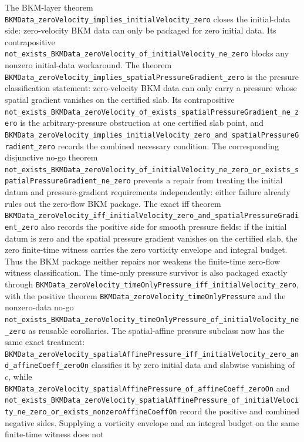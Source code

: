 \documentclass[11pt]{article}
\begin{document}
The BKM-layer theorem
\texttt{BKMData\_zeroVelocity\_implies\_initialVelocity\_zero}
closes the initial-data side: zero-velocity BKM data can only be packaged for
zero initial data.  Its contrapositive
\texttt{not\_exists\_BKMData\_zeroVelocity\_of\_initialVelocity\_ne\_zero}
blocks any nonzero initial-data workaround.  The theorem
\texttt{BKMData\_zeroVelocity\_implies\_spatialPressureGradient\_zero}
is the pressure classification statement: zero-velocity BKM data can only carry a
pressure whose spatial gradient vanishes on the certified slab.  Its
contrapositive
\texttt{not\_exists\_BKMData\_zeroVelocity\_of\_exists\_spatialPressureGradient\_ne\_zero}
is the arbitrary-pressure obstruction at one certified slab point, and
\texttt{BKMData\_zeroVelocity\_implies\_initialVelocity\_zero\_and\_spatialPressureGradient\_zero}
records the combined necessary condition.  The corresponding disjunctive
no-go theorem
\texttt{not\_exists\_BKMData\_zeroVelocity\_of\_initialVelocity\_ne\_zero\_or\_exists\_spatialPressureGradient\_ne\_zero}
prevents a repair from treating the initial datum and pressure-gradient
requirements independently: either failure already rules out the zero-flow BKM
package.  The exact iff theorem
\texttt{BKMData\_zeroVelocity\_iff\_initialVelocity\_zero\_and\_spatialPressureGradient\_zero}
also records the positive side for smooth pressure fields: if the initial datum
is zero and the spatial pressure gradient vanishes on the certified slab, the
zero finite-time witness carries the zero vorticity envelope and integral
budget.  Thus the BKM package neither repairs nor weakens the finite-time
zero-flow witness classification.  The time-only pressure survivor is also
packaged exactly through
\texttt{BKMData\_zeroVelocity\_timeOnlyPressure\_iff\_initialVelocity\_zero},
with the positive theorem
\texttt{BKMData\_zeroVelocity\_timeOnlyPressure} and the nonzero-data no-go
\texttt{not\_exists\_BKMData\_zeroVelocity\_timeOnlyPressure\_of\_initialVelocity\_ne\_zero}
as reusable corollaries.  The spatial-affine pressure subclass now has the
same exact treatment:
\texttt{BKMData\_zeroVelocity\_spatialAffinePressure\_iff\_initialVelocity\_zero\_and\_affineCoeff\_zeroOn}
classifies it by zero initial data and slabwise vanishing of \(c\), while
\texttt{BKMData\_zeroVelocity\_spatialAffinePressure\_of\_affineCoeff\_zeroOn}
and
\texttt{not\_exists\_BKMData\_zeroVelocity\_spatialAffinePressure\_of\_initialVelocity\_ne\_zero\_or\_exists\_nonzeroAffineCoeffOn}
record the positive and combined negative sides.  Supplying a vorticity
envelope and an integral budget on the same finite-time witness does not
\end{document}
